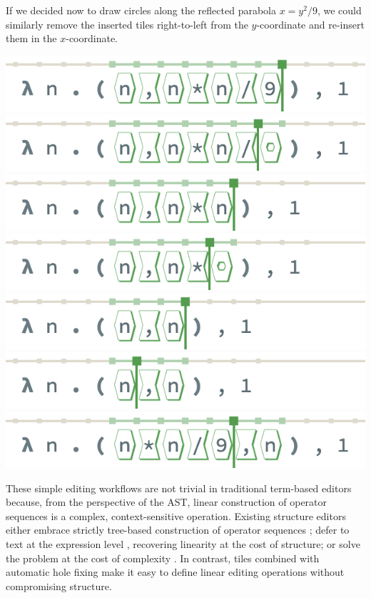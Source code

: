 If we decided now to draw circles along the reflected
parabola $x = y^2/9$, we could similarly remove the inserted
tiles right-to-left from the $y$-coordinate and re-insert
them in the $x$-coordinate.

\begin{center}
  \includegraphics[width=0.6\columnwidth]{img/removal-0.png}
  \includegraphics[width=0.6\columnwidth]{img/removal-1.png}
  \includegraphics[width=0.6\columnwidth]{img/removal-2.png}
  \includegraphics[width=0.6\columnwidth]{img/removal-3.png}
  \includegraphics[width=0.6\columnwidth]{img/removal-4.png}
  \includegraphics[width=0.6\columnwidth]{img/removal-5.png}
  \includegraphics[width=0.6\columnwidth]{img/removal-6.png}
\end{center}

These simple editing workflows are not trivial
in traditional term-based editors because,
from the perspective of the AST, linear construction of
operator sequences is a complex, context-sensitive operation.
Existing structure editors either embrace strictly tree-based
construction of operator sequences \cite{scratch};
defer to text at the expression level \cite{Cornell,greenfoot},
recovering linearity at the cost of structure;
or solve the problem at the cost of complexity
\cite{GrammarCells}.
In contrast, tiles combined with automatic hole fixing
make it easy to define linear editing operations
without compromising structure.


